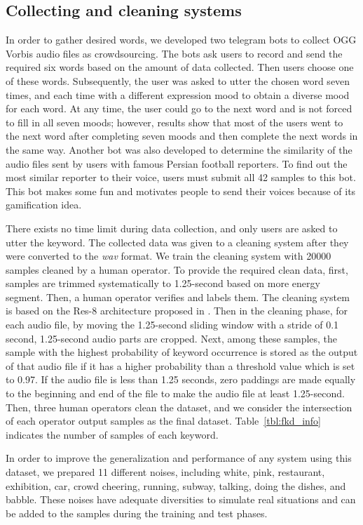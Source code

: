 \documentclass{article}
\begin{document}
\subsection{Collecting and cleaning systems}
In order to gather desired words, we developed two telegram bots to collect OGG Vorbis audio files as crowdsourcing. The bots ask users to record and send the required six words based on the amount of data collected. Then users choose one of these words. Subsequently, the user was asked to utter the chosen word seven times, and each time with a different expression mood to obtain a diverse mood for each word. At any time, the user could go to the next word and is not forced to fill in all seven moods; however, results show that most of the users went to the next word after completing seven moods and then complete the next words in the same way. Another bot was also developed to determine the similarity of the audio files sent by users with famous Persian football reporters. To find out the most similar reporter to their voice, users must submit all 42 samples to this bot. This bot makes some fun and motivates people to send their voices because of its gamification idea.

There exists no time limit during data collection, and only users are asked to utter the keyword. The collected data was given to a cleaning system after they were converted to the \textit{wav} format. We train the cleaning system with 20000 samples cleaned by a human operator. To provide the required clean data, first, samples are trimmed systematically to 1.25-second based on more energy segment. Then, a human operator verifies and labels them. The cleaning system is based on the Res-8 architecture proposed in \cite{honk}. Then in the cleaning phase, for each audio file, by moving the 1.25-second sliding window with a stride of 0.1 second, 1.25-second audio parts are cropped. Next, among these samples, the sample with the highest probability of keyword occurrence is stored as the output of that audio file if it has a higher probability than a threshold value which is set to 0.97. If the audio file is less than 1.25 seconds, zero paddings are made equally to the beginning and end of the file to make the audio file at least 1.25-second. Then, three human operators clean the dataset, and we consider the intersection of each operator output samples as the final dataset. Table~\ref{tbl:fkd_info} indicates the number of samples of each keyword.

In order to improve the generalization and performance of any system using this dataset, we prepared 11 different noises, including white, pink, restaurant, exhibition, car, crowd cheering, running, subway, talking, doing the dishes, and babble. These noises have adequate diversities to simulate real situations and can be added to the samples during the training and test phases.
\end{document}
